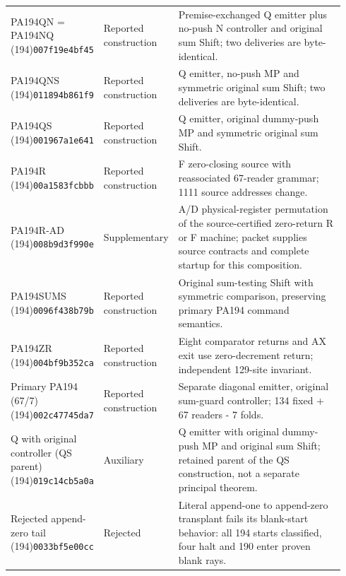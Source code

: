 \begin{longtable}{@{}p{0.24\linewidth}p{0.14\linewidth}p{0.56\linewidth}@{}}
PA194QN = PA194NQ (194)\newline\texttt{007f19e4bf45} & Reported construction & Premise-exchanged Q emitter plus no-push N controller and original sum Shift; two deliveries are byte-identical.\\[4pt]
PA194QNS (194)\newline\texttt{011894b861f9} & Reported construction & Q emitter, no-push MP and symmetric original sum Shift; two deliveries are byte-identical.\\[4pt]
PA194QS (194)\newline\texttt{001967a1e641} & Reported construction & Q emitter, original dummy-push MP and symmetric original sum Shift.\\[4pt]
PA194R (194)\newline\texttt{00a1583fcbbb} & Reported construction & F zero-closing source with reassociated 67-reader grammar; 1111 source addresses change.\\[4pt]
PA194R-AD (194)\newline\texttt{008b9d3f990e} & Supplementary & A/D physical-register permutation of the source-certified zero-return R or F machine; packet supplies source contracts and complete startup for this composition.\\[4pt]
PA194SUMS (194)\newline\texttt{0096f438b79b} & Reported construction & Original sum-testing Shift with symmetric comparison, preserving primary PA194 command semantics.\\[4pt]
PA194ZR (194)\newline\texttt{004bf9b352ca} & Reported construction & Eight comparator returns and AX exit use zero-decrement return; independent 129-site invariant.\\[4pt]
Primary PA194 (67/7) (194)\newline\texttt{002c47745da7} & Reported construction & Separate diagonal emitter, original sum-guard controller; 134 fixed + 67 readers - 7 folds.\\[4pt]
Q with original controller (QS parent) (194)\newline\texttt{019c14cb5a0a} & Auxiliary & Q emitter with original dummy-push MP and original sum Shift; retained parent of the QS construction, not a separate principal theorem.\\[4pt]
Rejected append-zero tail (194)\newline\texttt{0033bf5e00cc} & Rejected & Literal append-one to append-zero transplant fails its blank-start behavior: all 194 starts classified, four halt and 190 enter proven blank rays.\\[4pt]

\end{longtable}
